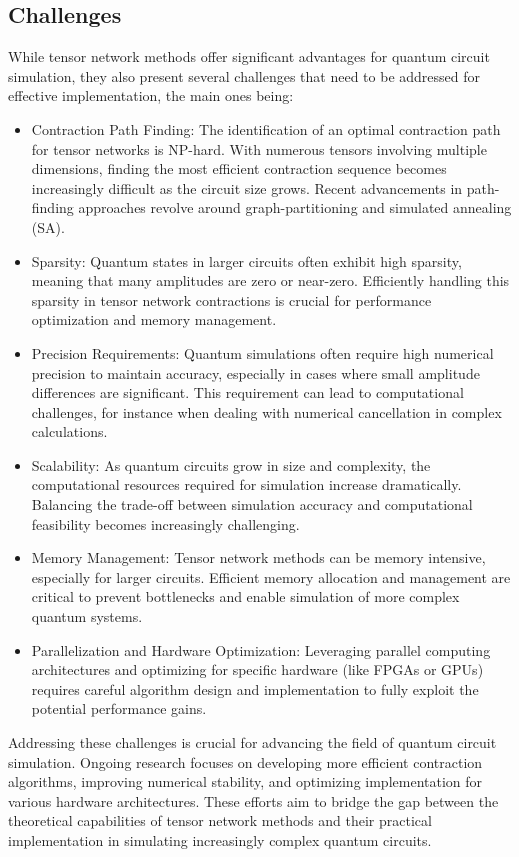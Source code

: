 \documentclass[12pt,oneside,a4paper]{article}
\begin{document}
\subsection{Challenges}
While tensor network methods offer significant advantages for quantum circuit simulation, they also present several challenges that need to be addressed for effective implementation, the main ones being:
\begin{itemize}
    \item Contraction Path Finding: The identification of an optimal contraction path for tensor networks is NP-hard. With numerous tensors involving multiple dimensions, finding the most efficient contraction sequence becomes increasingly difficult as the circuit size grows. Recent advancements in path-finding approaches revolve around graph-partitioning and simulated annealing (SA).
    \item Sparsity: Quantum states in larger circuits often exhibit high sparsity, meaning that many amplitudes are zero or near-zero. Efficiently handling this sparsity in tensor network contractions is crucial for performance optimization and memory management.
    \item Precision Requirements: Quantum simulations often require high numerical precision to maintain accuracy, especially in cases where small amplitude differences are significant. This requirement can lead to computational challenges, for instance when dealing with numerical cancellation in complex calculations.
    \item Scalability: As quantum circuits grow in size and complexity, the computational resources required for simulation increase dramatically. Balancing the trade-off between simulation accuracy and computational feasibility becomes increasingly challenging.
    \item Memory Management: Tensor network methods can be memory intensive, especially for larger circuits. Efficient memory allocation and management are critical to prevent bottlenecks and enable simulation of more complex quantum systems.
    \item Parallelization and Hardware Optimization: Leveraging parallel computing architectures and optimizing for specific hardware (like FPGAs or GPUs) requires careful algorithm design and implementation to fully exploit the potential performance gains.
\end{itemize}

Addressing these challenges is crucial for advancing the field of quantum circuit simulation. Ongoing research focuses on developing more efficient contraction algorithms, improving numerical stability, and optimizing implementation for various hardware architectures. These efforts aim to bridge the gap between the theoretical capabilities of tensor network methods and their practical implementation in simulating increasingly complex quantum circuits.
\end{document}
